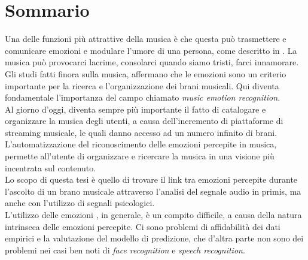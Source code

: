 \chapter{Sommario}
\label{Sommario}

\thispagestyle{empty}

\indent Una delle funzioni più attrattive della musica è che questa può trasmettere e comunicare emozioni e modulare l'umore di una persona, come descritto in \cite{feng2003popular}. La musica può provocarci lacrime, consolarci quando siamo tristi, farci innamorare.
\\
Gli studi fatti finora sulla musica, affermano che le emozioni sono un criterio importante per la ricerca e l'organizzazione dei brani musicali. Qui diventa fondamentale l'importanza del campo chiamato \textit{music emotion recognition}.
\\ \indent
Al giorno d'oggi, diventa sempre più importante il fatto di catalogare e organizzare la musica degli utenti, a causa dell'incremento di piattaforme di streaming musicale, le quali danno accesso ad un numero infinito di brani.
\\
L'automatizzazione del riconoscimento delle emozioni percepite in musica, permette all'utente di organizzare e ricercare la musica in una visione più incentrata sul contenuto.
\\ \indent
Lo scopo di questa tesi è quello di trovare il link tra emozioni percepite durante l'ascolto di un brano musicale attraverso l'analisi del segnale audio in primis, ma anche con l'utilizzo di segnali psicologici.
\\ \indent
L'utilizzo delle emozioni , in generale, è un compito difficile, a causa della natura intrinseca delle emozioni percepite. Ci sono problemi di affidabilità dei dati empirici e la valutazione del modello di predizione, che d'altra parte non sono dei problemi nei casi ben noti di \textit{face recognition} e \textit{speech recognition}.